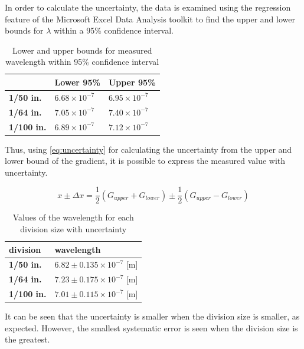 \documentclass{article}
\begin{document}
In order to calculate the uncertainty, the data is examined using the regression feature of the Microsoft Excel Data Analysis toolkit to find the upper and lower bounds for $\lambda$ within a 95\% confidence interval.

\begin{table}[H]
\begin{tabular}{|l|l|l|}
\hline
               & \textbf{Lower 95\%}    & \textbf{Upper 95\%}   \\ \hline
\textbf{1/50 in.}  & $6.68 \times 10^{-7}$ & $6.95 \times 10^{-7}$ \\ \hline
\textbf{1/64 in.}  & $7.05 \times 10^{-7}$ & $7.40 \times 10^{-7}$ \\ \hline
\textbf{1/100 in.} & $6.89 \times 10^{-7}$  & $7.12 \times 10^{-7}$ \\ \hline
\end{tabular}
\caption{Lower and upper bounds for measured wavelength within 95\% confidence interval}
\label{tb:lambda}
\end{table}

Thus, using \eqref{eq:uncertainty} \autocite{UPCSE2018} for calculating the uncertainty from the upper and lower bound of the gradient, it is possible to express the measured value with uncertainty.

\begin{equation}\label{eq:uncertainty}
  x \pm \Delta x = \frac{1}{2}(G_{upper} + G_{lower})  \pm \frac{1}{2} (G_{upper} - G_{lower})
\end{equation}

\begin{table}[H]
\begin{tabular}{|l|l|}
\hline
\textbf{division}  & \textbf{wavelength}                 \\ \hline
\textbf{1/50 in.}  & $6.82 \pm 0.135 \times 10^{-7}$ [m] \\ \hline
\textbf{1/64 in.}  & $7.23 \pm 0.175 \times 10^{-7}$ [m] \\ \hline
\textbf{1/100 in.} & $7.01 \pm 0.115 \times 10^{-7}$ [m] \\ \hline
\end{tabular}
\caption{Values of the wavelength for each division size with uncertainty}
\label{tb:result}
\end{table}

It can be seen that the uncertainty is smaller when the division size is smaller, as expected. However, the smallest systematic error is seen when the division size is the greatest.
\end{document}
